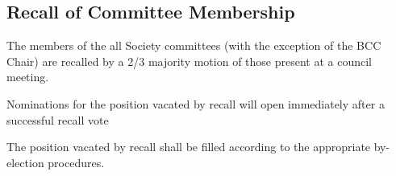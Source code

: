 \subsection{Recall of Committee Membership}
\begin{longenum}
\item The members of the all Society committees (with the exception of the BCC Chair) are recalled by a 2/3 majority motion of those present at a council meeting.
\item  Nominations for the position vacated by recall will open immediately after a successful recall vote
\item The position vacated by recall shall be filled according to the appropriate by-election procedures.
\end{longenum}
\newpage

